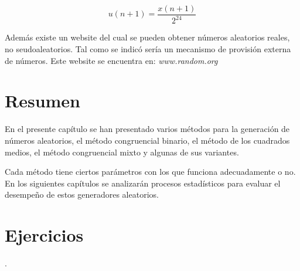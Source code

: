 $$u(n+1) = \frac{x(n+1)}{2^{24}}$$


Además existe un website del cual se pueden obtener números aleatorios reales, no seudoaleatorios. Tal como se indicó sería un mecanismo de provisión externa de números. Este website se encuentra en:
\textit{www.random.org}


\section{Resumen}


En el presente capítulo se han presentado varios métodos para la generación de números aleatorios, el método congruencial binario, el método de los cuadrados medios, el método congruencial mixto y algunas de sus variantes.

Cada método tiene ciertos parámetros con los que funciona adecuadamente o no. En los siguientes capítulos se analizarán procesos estadísticos para evaluar el desempeño de estos generadores aleatorios.



 
\section{Ejercicios}.


